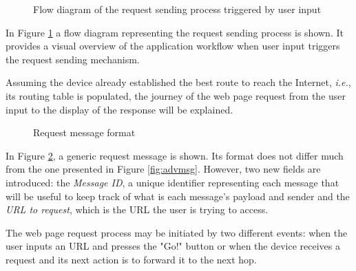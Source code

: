 \begin{figure}[ht]
	\noindent{}
	\caption{\label{fig:rqtflux} Flow diagram of the request sending process triggered by user input}
\end{figure}

In Figure \ref{fig:rqtflux} a flow diagram representing the request sending process is shown. It provides a visual overview of the application workflow when user input triggers the request sending mechanism.

Assuming the device already established the best route to reach the Internet, \textit{i.e.}, its routing table is populated, the journey of the web page request from the user input to the display of the response will be explained.

\begin{figure}[ht]
	\noindent{}
	\caption{\label{fig:rqtmsg} Request message format}
\end{figure}

In Figure \ref{fig:rqtmsg}, a generic request message is shown. Its format does not differ much from the one presented in Figure \ref{fig:advmsg}. However, two new fields are introduced: the \textit{Message ID}, a unique identifier representing each message that will be useful to keep track of what is each message's payload and sender and the \textit{\gls{URL} to request}, which is the \gls{URL} the user is trying to access.

The web page request process may be initiated by two different events: when the user inputs an \gls{URL} and presses the "Go!" button or when the device receives a request and its next action is to forward it to the next hop.

